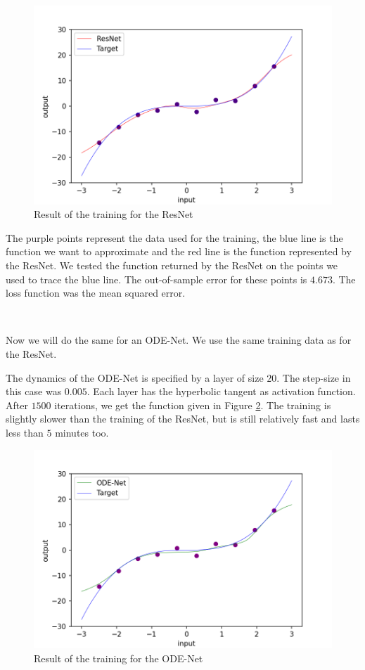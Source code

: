 \documentclass[10pt,a4paper]{article}
\theoremstyle{definition}
\theoremstyle{plain}
\begin{document}
\begin{figure}[!h]
\center
\includegraphics[scale=0.75]{ex_resnet.png}
\caption{Result of the training for the ResNet}
\label{example_resnet}
\end{figure}

The purple points represent the data used for the training, the blue line is the function we want to approximate and the red line is the function represented by the ResNet. We tested the function returned by the ResNet on the points we used to trace the blue line. The out-of-sample error for these points is $4.673$. The loss function was the mean squared error.

~

Now we will do the same for an ODE-Net. We use the same training data as for the ResNet.

The dynamics of the ODE-Net is specified by a layer of size $20$. The step-size in this case was $0.005$. Each layer has the hyperbolic tangent as activation function. After $1500$ iterations, we get the function given in Figure \ref{example_odenet}. The training is slightly slower than the training of the ResNet, but is still relatively fast and lasts less than $5$ minutes too. 

\begin{figure}[!h]
\center
\includegraphics[scale=0.75]{ex_odenet_final.png}
\caption{Result of the training for the ODE-Net}
\label{example_odenet}
\end{figure}
\end{document}
